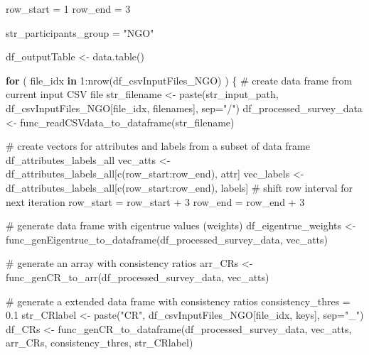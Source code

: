 \documentclass[
]{article}
\newenvironment{Shaded}{\begin{snugshade}}{\end{snugshade}}
\newcommand{\AttributeTok}[1]{\textcolor[rgb]{0.00,0.34,0.68}{#1}}
\newcommand{\CommentTok}[1]{\textcolor[rgb]{0.54,0.53,0.53}{#1}}
\newcommand{\ControlFlowTok}[1]{\textcolor[rgb]{0.12,0.11,0.11}{\textbf{#1}}}
\newcommand{\DecValTok}[1]{\textcolor[rgb]{0.69,0.50,0.00}{#1}}
\newcommand{\FloatTok}[1]{\textcolor[rgb]{0.69,0.50,0.00}{#1}}
\newcommand{\FunctionTok}[1]{\textcolor[rgb]{0.39,0.29,0.61}{#1}}
\newcommand{\NormalTok}[1]{\textcolor[rgb]{0.12,0.11,0.11}{#1}}
\newcommand{\OtherTok}[1]{\textcolor[rgb]{0.00,0.43,0.16}{#1}}
\newcommand{\SpecialCharTok}[1]{\textcolor[rgb]{0.24,0.68,0.91}{#1}}
\newcommand{\StringTok}[1]{\textcolor[rgb]{0.75,0.01,0.01}{#1}}
\begin{document}
\begin{Shaded}
\begin{Highlighting}[]
\NormalTok{row\_start }\OtherTok{=} \DecValTok{1}
\NormalTok{row\_end }\OtherTok{=} \DecValTok{3}

\NormalTok{str\_participants\_group }\OtherTok{=} \StringTok{"NGO"}

\NormalTok{df\_outputTable }\OtherTok{\textless{}{-}} \FunctionTok{data.table}\NormalTok{()}

\ControlFlowTok{for}\NormalTok{ ( file\_idx }\ControlFlowTok{in} \DecValTok{1}\SpecialCharTok{:}\FunctionTok{nrow}\NormalTok{(df\_csvInputFiles\_NGO) ) \{}
  \CommentTok{\# create data frame from current input CSV file}
\NormalTok{  str\_filename }\OtherTok{\textless{}{-}} \FunctionTok{paste}\NormalTok{(str\_input\_path, df\_csvInputFiles\_NGO[file\_idx, filenames], }\AttributeTok{sep=}\StringTok{"/"}\NormalTok{)}
\NormalTok{  df\_processed\_survey\_data }\OtherTok{\textless{}{-}} \FunctionTok{func\_readCSVdata\_to\_dataframe}\NormalTok{(str\_filename)}
  
  \CommentTok{\# create vectors for attributes and labels from a subset of data frame \textquotesingle{}df\_attributes\_labels\_all\textquotesingle{}}
\NormalTok{  vec\_atts }\OtherTok{\textless{}{-}}\NormalTok{ df\_attributes\_labels\_all[}\FunctionTok{c}\NormalTok{(row\_start}\SpecialCharTok{:}\NormalTok{row\_end), attr]}
\NormalTok{  vec\_labels }\OtherTok{\textless{}{-}}\NormalTok{ df\_attributes\_labels\_all[}\FunctionTok{c}\NormalTok{(row\_start}\SpecialCharTok{:}\NormalTok{row\_end), labels]}
  \CommentTok{\# shift row interval for next iteration}
\NormalTok{  row\_start }\OtherTok{=}\NormalTok{ row\_start }\SpecialCharTok{+} \DecValTok{3}
\NormalTok{  row\_end }\OtherTok{=}\NormalTok{ row\_end }\SpecialCharTok{+} \DecValTok{3}
  
  \CommentTok{\# generate data frame with eigentrue values (weights) }
\NormalTok{  df\_eigentrue\_weights }\OtherTok{\textless{}{-}} \FunctionTok{func\_genEigentrue\_to\_dataframe}\NormalTok{(df\_processed\_survey\_data, vec\_atts)}
  
  \CommentTok{\# generate an array with consistency ratios}
\NormalTok{  arr\_CRs }\OtherTok{\textless{}{-}} \FunctionTok{func\_genCR\_to\_arr}\NormalTok{(df\_processed\_survey\_data, vec\_atts)}

  \CommentTok{\# generate a extended data frame with consistency ratios}
\NormalTok{  consistency\_thres }\OtherTok{=} \FloatTok{0.1}
\NormalTok{  str\_CRlabel }\OtherTok{\textless{}{-}} \FunctionTok{paste}\NormalTok{(}\StringTok{"CR"}\NormalTok{, df\_csvInputFiles\_NGO[file\_idx, keys], }\AttributeTok{sep=}\StringTok{"\_"}\NormalTok{)}
\NormalTok{  df\_CRs }\OtherTok{\textless{}{-}} \FunctionTok{func\_genCR\_to\_dataframe}\NormalTok{(df\_processed\_survey\_data, vec\_atts, arr\_CRs, consistency\_thres, str\_CRlabel)}
  

\end{Highlighting}
\end{Shaded}
\end{document}
